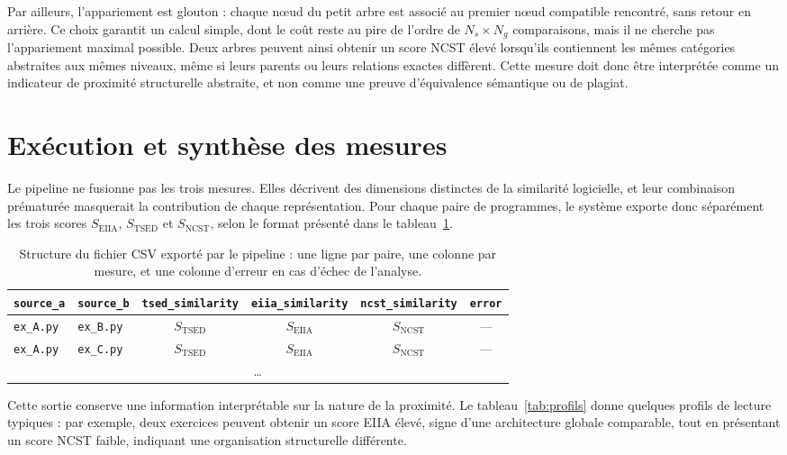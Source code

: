 {Par ailleurs, l'appariement est glouton : chaque nœud du petit arbre est
associé au premier nœud compatible rencontré, sans retour en arrière. Ce choix
garantit un calcul simple, dont le coût reste au pire de l'ordre de
$N_s \times N_g$ comparaisons, mais il ne cherche pas l'appariement maximal
possible. Deux
arbres peuvent ainsi obtenir un score NCST élevé lorsqu'ils contiennent les
mêmes catégories abstraites aux mêmes niveaux, même si leurs parents ou leurs
relations exactes diffèrent. Cette mesure doit donc être interprétée comme un
indicateur de proximité structurelle abstraite, et non comme une preuve
d'équivalence sémantique ou de plagiat.

\section{Exécution et synthèse des mesures}

Le pipeline ne fusionne pas les trois mesures. Elles décrivent des dimensions
distinctes de la similarité logicielle, et leur combinaison prématurée
masquerait la contribution de chaque représentation. Pour chaque paire de
programmes, le système exporte donc séparément les trois scores
$S_{\mathrm{EIIA}}$, $S_{\mathrm{TSED}}$ et $S_{\mathrm{NCST}}$, selon le
format présenté dans le tableau~\ref{tab:csv}.

\begin{table}[htbp]
\centering
\small
\begin{tabular}{llcccc}
\toprule
\texttt{source\_a} & \texttt{source\_b} & \texttt{tsed\_similarity} &
\texttt{eiia\_similarity} & \texttt{ncst\_similarity} & \texttt{error} \\
\midrule
\texttt{ex\_A.py} & \texttt{ex\_B.py} & $S_{\mathrm{TSED}}$ & $S_{\mathrm{EIIA}}$ & $S_{\mathrm{NCST}}$ & --- \\
\texttt{ex\_A.py} & \texttt{ex\_C.py} & $S_{\mathrm{TSED}}$ & $S_{\mathrm{EIIA}}$ & $S_{\mathrm{NCST}}$ & --- \\
\multicolumn{6}{c}{\dots} \\
\bottomrule
\end{tabular}
\caption{Structure du fichier CSV exporté par le pipeline : une ligne par
paire, une colonne par mesure, et une colonne d'erreur en cas d'échec de
l'analyse.}
\label{tab:csv}
\end{table}

Cette sortie conserve une information interprétable sur la nature de la
proximité. Le tableau~\ref{tab:profils} donne quelques profils de lecture
typiques : par exemple, deux exercices peuvent obtenir un score EIIA élevé,
signe d'une architecture globale comparable, tout en présentant un score NCST
faible, indiquant une organisation structurelle différente.

}
